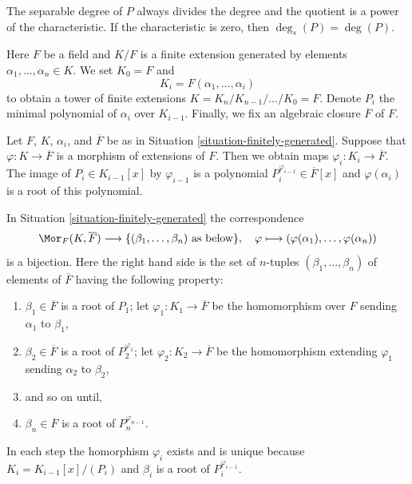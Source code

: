 \noindent
The separable degree of $P$ always divides the degree and the quotient
is a power of the characteristic. If the characteristic is zero, then
$\deg_s(P) = \deg(P)$.

\begin{situation}
\label{situation-finitely-generated}
Here $F$ be a field and $K/F$ is a finite extension generated by elements
$\alpha_1, \ldots, \alpha_n \in K$. We set $K_0 = F$ and
$$
K_i = F(\alpha_1, \ldots, \alpha_i)
$$
to obtain a tower of finite extensions
$K = K_n / K_{n - 1} / \ldots / K_0 = F$.
Denote $P_i$ the minimal polynomial of $\alpha_i$ over $K_{i - 1}$.
Finally, we fix an algebraic closure $\overline{F}$ of $F$.
\end{situation}

\noindent
Let $F$, $K$, $\alpha_i$, and $\overline{F}$ be as in
Situation \ref{situation-finitely-generated}.
Suppose that $\varphi : K \to \overline{F}$ is a morphism of extensions
of $F$. Then we obtain maps $\varphi_i : K_i \to \overline{F}$.
The image of $P_i \in K_{i - 1}[x]$ by $\varphi_{i - 1}$
is a polynomial $P_i^{\varphi_{i - 1}} \in \overline{F}[x]$
and $\varphi(\alpha_i)$ is a root of this polynomial.

\begin{lemma}
\label{lemma-count-embeddings}
In Situation \ref{situation-finitely-generated} the correspondence
$$
\Mor_F(K, \overline{F})
\longrightarrow
\{(\beta_1, \ldots, \beta_n)\text{ as below}\},
\quad
\varphi \longmapsto (\varphi(\alpha_1), \ldots, \varphi(\alpha_n))
$$
is a bijection. Here the right hand side is the set of $n$-tuples
$(\beta_1, \ldots, \beta_n)$ of elements of $\overline{F}$ having
the following property:
\begin{enumerate}
\item $\beta_1 \in \overline{F}$ is a root of $P_1$;
let $\varphi_1 : K_1 \to \overline{F}$ be the homomorphism
over $F$ sending $\alpha_1$ to $\beta_1$,
\item $\beta_2 \in \overline{F}$ is a root of $P_2^{\varphi_1}$;
let $\varphi_2 : K_2 \to \overline{F}$ be the homomorphism
extending $\varphi_1$ sending $\alpha_2$ to $\beta_2$,
\item and so on until,
\item $\beta_n \in \overline{F}$ is a root of $P_n^{\varphi_{n - 1}}$.
\end{enumerate}
In each step the homorphism $\varphi_i$ exists and is unique because
$K_i = K_{i - 1}[x]/(P_i)$ and $\beta_i$ is a root of $P_i^{\varphi_{i - 1}}$.
\end{lemma}

